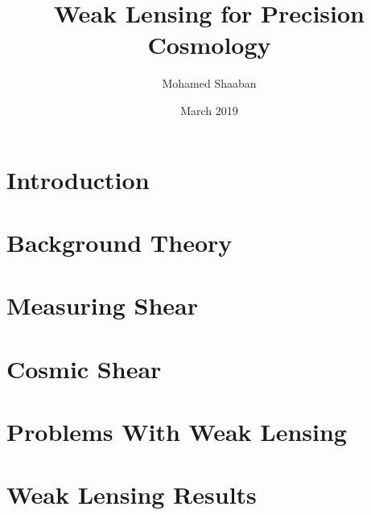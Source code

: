 \documentclass{article}
\title{Weak Lensing for Precision Cosmology}
\author{Mohamed Shaaban}
\date{March 2019}
\begin{document}
\maketitle

\section{Introduction}


\section{Background Theory}


\section{Measuring Shear}

\section{Cosmic Shear}
\cite{lensingbook} \cite{rachel_2018} \cite{hoekstra}

\section{Problems With Weak Lensing}
\cite{massey_2013}

\section{Weak Lensing Results}
\cite{Subaru_2019}



\end{document}
